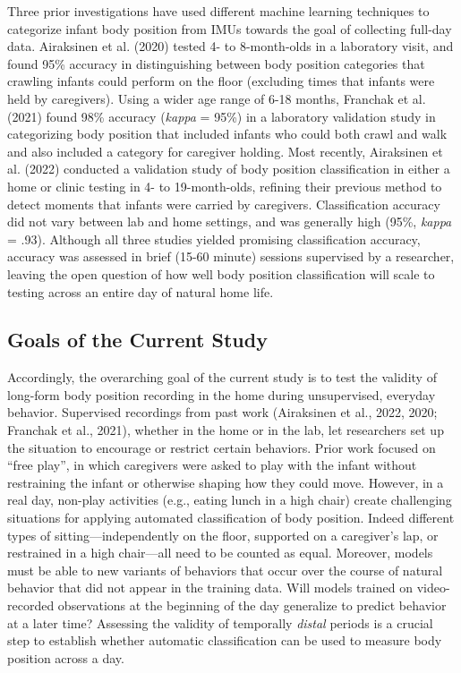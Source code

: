 \documentclass[
  man]{apa6}
\begin{document}
Three prior investigations have used different machine learning techniques to categorize infant body position from IMUs towards the goal of collecting full-day data. Airaksinen et al. (2020) tested 4- to 8-month-olds in a laboratory visit, and found 95\% accuracy in distinguishing between body position categories that crawling infants could perform on the floor (excluding times that infants were held by caregivers). Using a wider age range of 6-18 months, Franchak et al. (2021) found 98\% accuracy (\emph{kappa} = 95\%) in a laboratory validation study in categorizing body position that included infants who could both crawl and walk and also included a category for caregiver holding. Most recently, Airaksinen et al. (2022) conducted a validation study of body position classification in either a home or clinic testing in 4- to 19-month-olds, refining their previous method to detect moments that infants were carried by caregivers. Classification accuracy did not vary between lab and home settings, and was generally high (95\%, \emph{kappa} = .93). Although all three studies yielded promising classification accuracy, accuracy was assessed in brief (15-60 minute) sessions supervised by a researcher, leaving the open question of how well body position classification will scale to testing across an entire day of natural home life.

\hypertarget{goals-of-the-current-study}{%
\subsection{Goals of the Current Study}\label{goals-of-the-current-study}}

Accordingly, the overarching goal of the current study is to test the validity of long-form body position recording in the home during unsupervised, everyday behavior. Supervised recordings from past work (Airaksinen et al., 2022, 2020; Franchak et al., 2021), whether in the home or in the lab, let researchers set up the situation to encourage or restrict certain behaviors. Prior work focused on ``free play'', in which caregivers were asked to play with the infant without restraining the infant or otherwise shaping how they could move. However, in a real day, non-play activities (e.g., eating lunch in a high chair) create challenging situations for applying automated classification of body position. Indeed different types of sitting---independently on the floor, supported on a caregiver's lap, or restrained in a high chair---all need to be counted as equal. Moreover, models must be able to new variants of behaviors that occur over the course of natural behavior that did not appear in the training data. Will models trained on video-recorded observations at the beginning of the day generalize to predict behavior at a later time? Assessing the validity of temporally \emph{distal} periods is a crucial step to establish whether automatic classification can be used to measure body position across a day.
\end{document}
